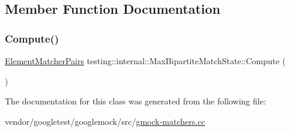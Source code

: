 \subsection{Member Function Documentation}
\mbox{\label{classtesting_1_1internal_1_1_max_bipartite_match_state_af6efab664ee390925b24d023f1368192}} 
\subsubsection{\texorpdfstring{Compute()}{Compute()}}
{\footnotesize\ttfamily \hyperlink{namespacetesting_1_1internal_a0038618710c01a71150887dc7cfb0a29}{Element\+Matcher\+Pairs} testing\+::internal\+::\+Max\+Bipartite\+Match\+State\+::\+Compute (\begin{DoxyParamCaption}{ }\end{DoxyParamCaption})\hspace{0.3cm}{\ttfamily [inline]}}



The documentation for this class was generated from the following file\+:\begin{DoxyCompactItemize}
\item 
vendor/googletest/googlemock/src/\hyperlink{gmock-matchers_8cc}{gmock-\/matchers.\+cc}\end{DoxyCompactItemize}
